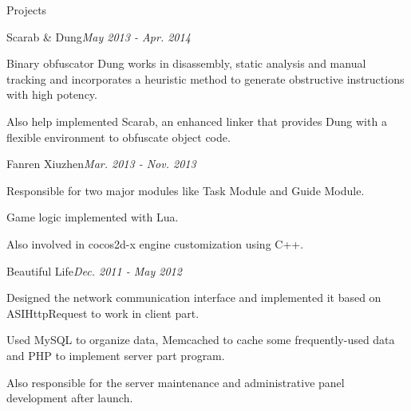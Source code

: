 \documentclass{resume} %
\begin{document}

\begin{rSection}{Projects}

\begin{rSubsection}{Scarab \& Dung}{\em May 2013 - Apr. 2014}{}{}
\item Binary obfuscator Dung works in disassembly, static analysis and manual tracking and incorporates a heuristic method to generate obstructive instructions with high potency.
\item Also help implemented Scarab, an enhanced linker that provides Dung with a flexible environment to obfuscate object code.
\end{rSubsection}

\begin{rSubsection}{Fanren Xiuzhen}{\em Mar. 2013 - Nov. 2013}{}{}
\item Responsible for two major modules like Task Module and Guide Module.
\item Game logic implemented with Lua.
\item Also involved in cocos2d-x engine customization using C++.
\end{rSubsection}

\begin{rSubsection}{Beautiful Life}{\em Dec. 2011 - May 2012}{}{}
\item Designed the network communication interface and implemented it based on ASIHttpRequest to work in client part.
\item Used MySQL to organize data, Memcached to cache some frequently-used data and PHP to implement server part program.
\item Also responsible for the server maintenance and administrative panel development after launch.
\end{rSubsection}

\end{rSection}



\end{document}
